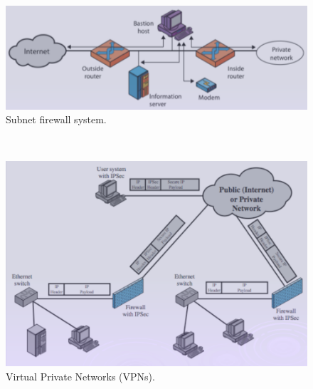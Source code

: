 \documentclass[11pt, a4paper, twoside, italian]{report}
\theoremstyle{plain}
\begin{document}
\begin{multicols}{2}
	~\\
	\begin{figure}[H]
		\centering
		\includegraphics[scale=0.52]{firewall3}
		\caption*{Subnet firewall system.}
	\end{figure}
	~\\
\columnbreak
	\begin{figure}[H]
		\centering
		\includegraphics[scale=0.5]{firewallVPN}
		\caption*{Virtual Private Networks (VPNs).}
	\end{figure}
\end{multicols}
\end{document}

